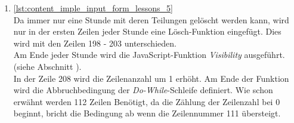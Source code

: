 \begin{enumerate}
	\item \autoref{lst:content_imple_input_form_lessons_5}\\
	Da immer nur eine Stunde mit deren Teilungen gelöscht werden kann, wird nur in der ersten Zeilen jeder Stunde eine Lösch-Funktion eingefügt. Dies wird mit den Zeilen 198 - 203 unterschieden.\\
	Am Ende jeder Stunde wird die JavaScript-Funktion \textit{Visibility} ausgeführt. (siehe Abschnitt ).\\
	In der Zeile 208 wird die Zeilenanzahl um 1 erhöht. Am Ende der Funktion wird die Abbruchbedingung der \textit{Do-While}-Schleife definiert. Wie schon erwähnt werden 112 Zeilen Benötigt, da die Zählung der Zeilenzahl bei 0 beginnt, bricht die Bedingung ab wenn die Zeilennummer 111 übersteigt.\\
	
	
	
\end{enumerate}


